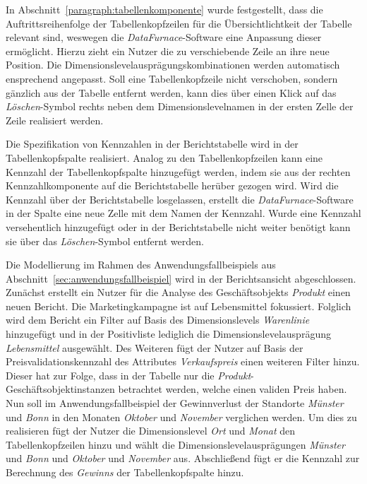 \documentclass[
  language=german, %
  type=bachelor,%
  ngerman
]{isthesis}
\begin{document}
\begin{content}
  In Abschnitt~\ref{paragraph:tabellenkomponente} wurde festgestellt, dass die
  Auftrittsreihenfolge der Tabellenkopfzeilen für die Übersichtlichtkeit der
  Tabelle relevant sind, weswegen die \textit{DataFurnace}-Software eine Anpassung
  dieser ermöglicht. Hierzu zieht ein Nutzer die zu
  verschiebende Zeile an ihre neue Position. Die
  Dimensionslevelausprägungskombinationen werden automatisch ensprechend
  angepasst. Soll eine Tabellenkopfzeile nicht verschoben, sondern gänzlich aus
  der Tabelle entfernt werden, kann dies über einen Klick auf das
  \textit{Löschen}-Symbol rechts neben dem Dimensionslevelnamen in der ersten
  Zelle der Zeile realisiert werden.

  Die Spezifikation von Kennzahlen in der Berichtstabelle wird in der
  Tabellenkopfspalte realisiert. Analog zu den Tabellenkopfzeilen kann eine
  Kennzahl der Tabellenkopfspalte hinzugefügt werden, indem sie aus der rechten
  Kennzahlkomponente auf die Berichtstabelle herüber gezogen wird. Wird die
  Kennzahl über der Berichtstabelle losgelassen, erstellt die
  \textit{DataFurnace}-Software in der Spalte eine neue Zelle mit dem Namen der
  Kennzahl. Wurde eine Kennzahl versehentlich hinzugefügt oder in der
  Berichtstabelle nicht weiter benötigt kann sie über das
  \textit{Löschen}-Symbol entfernt werden.

  Die Modellierung im Rahmen des Anwendungsfallbeispiels aus
  Abschnitt~\ref{sec:anwendungsfallbeispiel} wird in der Berichtsansicht
  abgeschlossen. Zunächst erstellt ein Nutzer für die Analyse des
  Geschäftsobjekts \textit{Produkt} einen neuen Bericht. Die Marketingkampagne
  ist auf Lebensmittel fokussiert. Folglich wird dem Bericht ein Filter auf
  Basis des Dimensionslevels \textit{Warenlinie} hinzugefügt und in der
  Positivliste lediglich die Dimensionslevelausprägung \textit{Lebensmittel}
  ausgewählt. Des Weiteren fügt der Nutzer auf Basis der
  Preisvalidationskennzahl des Attributes \textit{Verkaufspreis} einen weiteren
  Filter hinzu. Dieser hat zur Folge, dass in der Tabelle nur die
  \textit{Produkt}-Geschäftsobjektinstanzen betrachtet werden, welche einen
  validen Preis haben. Nun soll im Anwendungsfallbeispiel der Gewinnverlust der
  Standorte \textit{Münster} und \textit{Bonn} in den Monaten \textit{Oktober}
  und \textit{November} verglichen werden. Um dies zu realisieren fügt der
  Nutzer die Dimensionslevel \textit{Ort} und \textit{Monat} den
  Tabellenkopfzeilen hinzu und wählt die Dimensionslevelausprägungen
  \textit{Münster} und \textit{Bonn} und \textit{Oktober} und \textit{November}
  aus. Abschließend fügt er die Kennzahl zur Berechnung des \textit{Gewinns}
  der Tabellenkopfspalte hinzu.  


\end{content}
\end{document}
